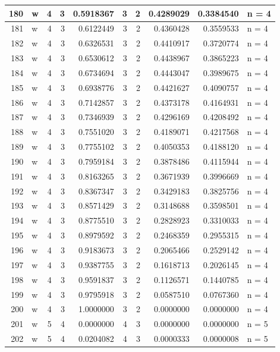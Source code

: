 \documentclass[
  letterpaper,
  DIV=11,
  numbers=noendperiod]{scrreprt}
\begin{document}
\begin{table}
\begin{tabular}[t]{r|l|r|r|r|r|r|r|r|l}
\hline
180 & w & 4 & 3 & 0.5918367 & 3 & 2 & 0.4289029 & 0.3384540 & n = 4\\
\hline
181 & w & 4 & 3 & 0.6122449 & 3 & 2 & 0.4360428 & 0.3559533 & n = 4\\
\hline
182 & w & 4 & 3 & 0.6326531 & 3 & 2 & 0.4410917 & 0.3720774 & n = 4\\
\hline
183 & w & 4 & 3 & 0.6530612 & 3 & 2 & 0.4438967 & 0.3865223 & n = 4\\
\hline
184 & w & 4 & 3 & 0.6734694 & 3 & 2 & 0.4443047 & 0.3989675 & n = 4\\
\hline
185 & w & 4 & 3 & 0.6938776 & 3 & 2 & 0.4421627 & 0.4090757 & n = 4\\
\hline
186 & w & 4 & 3 & 0.7142857 & 3 & 2 & 0.4373178 & 0.4164931 & n = 4\\
\hline
187 & w & 4 & 3 & 0.7346939 & 3 & 2 & 0.4296169 & 0.4208492 & n = 4\\
\hline
188 & w & 4 & 3 & 0.7551020 & 3 & 2 & 0.4189071 & 0.4217568 & n = 4\\
\hline
189 & w & 4 & 3 & 0.7755102 & 3 & 2 & 0.4050353 & 0.4188120 & n = 4\\
\hline
190 & w & 4 & 3 & 0.7959184 & 3 & 2 & 0.3878486 & 0.4115944 & n = 4\\
\hline
191 & w & 4 & 3 & 0.8163265 & 3 & 2 & 0.3671939 & 0.3996669 & n = 4\\
\hline
192 & w & 4 & 3 & 0.8367347 & 3 & 2 & 0.3429183 & 0.3825756 & n = 4\\
\hline
193 & w & 4 & 3 & 0.8571429 & 3 & 2 & 0.3148688 & 0.3598501 & n = 4\\
\hline
194 & w & 4 & 3 & 0.8775510 & 3 & 2 & 0.2828923 & 0.3310033 & n = 4\\
\hline
195 & w & 4 & 3 & 0.8979592 & 3 & 2 & 0.2468359 & 0.2955315 & n = 4\\
\hline
196 & w & 4 & 3 & 0.9183673 & 3 & 2 & 0.2065466 & 0.2529142 & n = 4\\
\hline
197 & w & 4 & 3 & 0.9387755 & 3 & 2 & 0.1618713 & 0.2026145 & n = 4\\
\hline
198 & w & 4 & 3 & 0.9591837 & 3 & 2 & 0.1126571 & 0.1440785 & n = 4\\
\hline
199 & w & 4 & 3 & 0.9795918 & 3 & 2 & 0.0587510 & 0.0767360 & n = 4\\
\hline
200 & w & 4 & 3 & 1.0000000 & 3 & 2 & 0.0000000 & 0.0000000 & n = 4\\
\hline
201 & w & 5 & 4 & 0.0000000 & 4 & 3 & 0.0000000 & 0.0000000 & n = 5\\
\hline
202 & w & 5 & 4 & 0.0204082 & 4 & 3 & 0.0000333 & 0.0000008 & n = 5\\

\end{tabular}
\end{table}
\end{document}
